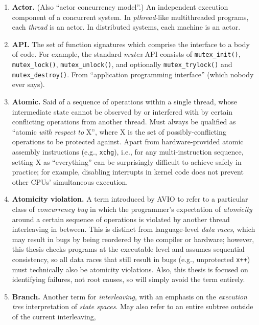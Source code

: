 \begin{enumerate}
	\item {\bf Actor.}
		(Also ``actor concurrency model''.)
		An independent execution component of a concurrent system.
		In {\em pthread}-like multithreaded programs, each {\em thread} is an actor.
		In distributed systems, each machine is an actor.
	\item {\bf API.}
		The set of function signatures which comprise the interface to a body of code.
		For example, the standard {\em mutex} API consists of
		{\tt mutex\_init()}, {\tt mutex\_lock()}, {\tt mutex\_unlock()},
		and optionally {\tt mutex\_trylock()} and {\tt mutex\_destroy()}.
		From ``application programming interface'' (which nobody ever says).
	\item {\bf Atomic.}
		Said of a sequence of operations within a single thread,
		whose intermediate state cannot be observed by or interfered with
		by certain conflicting operations from another thread.
		Must always be qualified as ``atomic {\em with respect to} X'',
		where X is the set of possibly-conflicting operations to be protected against.
		Apart from hardware-provided atomic assembly instructions (e.g., {\tt xchg}),
		i.e., for any multi-instruction sequence,
		setting X as ``everything'' can be surprisingly difficult to achieve safely in practice;
		for example, disabling interrupts in kernel code does not prevent other CPUs' simultaneous execution.
	\item {\bf Atomicity violation.}
		A term introduced by AVIO \cite{avio} to refer to a particular class of {\em concurrency bug}
		in which the programmer's expectation of {\em atomicity} around a certain sequence of operations
		is violated by another thread interleaving in between.
		This is distinct from language-level {\em data races},
		which may result in bugs by being reordered by the compiler or hardware;
		however, this thesis checks programs at the executable level and assumes sequential consistency,
		so all data races that still result in bugs (e.g., unprotected {\tt x++})
		must technically also be atomicity violations.
		Also, this thesis is focused on identifying failures, not root causes,
		so will simply avoid the term entirely.
	\item {\bf Branch.}
		Another term for {\em interleaving}, with an emphasis on the {\em execution tree}
		interpretation of {\em state spaces}.
		May also refer to an entire subtree outside of the current interleaving,

\end{enumerate}
